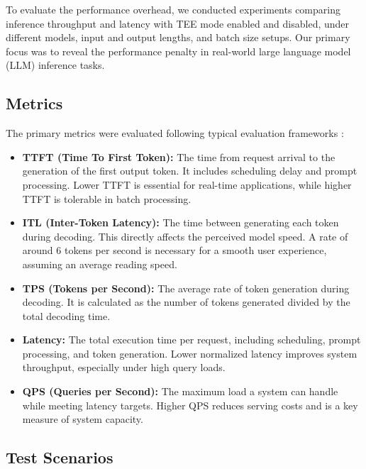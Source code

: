 \documentclass{article}
\begin{document}
To evaluate the performance overhead, we conducted experiments comparing inference throughput and latency with TEE mode enabled and disabled, under different models, input and output lengths, and batch size setups. Our primary focus was to reveal the performance penalty in real-world large language model (LLM) inference tasks.

\subsection{Metrics}

The primary metrics were evaluated following typical evaluation frameworks \cite{agrawal2024metron}:

\begin{itemize}
    \item \textbf{TTFT (Time To First Token):} The time from request arrival to the generation of the first output token. It includes scheduling delay and prompt processing. Lower TTFT is essential for real-time applications, while higher TTFT is tolerable in batch processing.

    \item \textbf{ITL (Inter-Token Latency):} The time between generating each token during decoding. This directly affects the perceived model speed. A rate of around 6 tokens per second is necessary for a smooth user experience, assuming an average reading speed.

    \item \textbf{TPS (Tokens per Second):} The average rate of token generation during decoding. It is calculated as the number of tokens generated divided by the total decoding time.

    \item \textbf{Latency:} The total execution time per request, including scheduling, prompt processing, and token generation. Lower normalized latency improves system throughput, especially under high query loads.

    \item \textbf{QPS (Queries per Second):} The maximum load a system can handle while meeting latency targets. Higher QPS reduces serving costs and is a key measure of system capacity.
\end{itemize}


\subsection{Test Scenarios}
\end{document}

